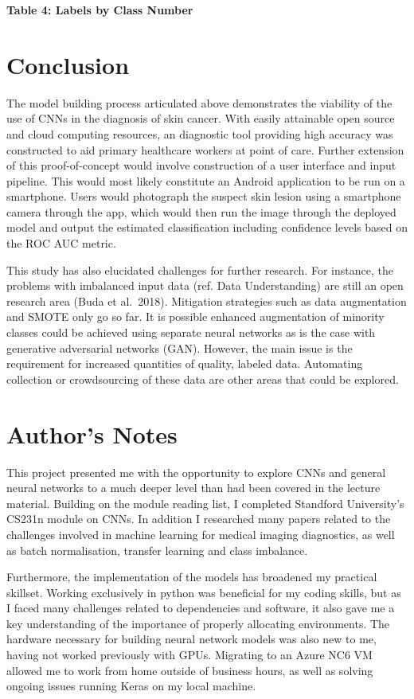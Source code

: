 \documentclass[11pt]{article}
\begin{document}
    \textbf{Table 4: Labels by Class Number}

    \hypertarget{conclusion}{%
\section{Conclusion}\label{conclusion}}

The model building process articulated above demonstrates the viability
of the use of CNNs in the diagnosis of skin cancer. With easily
attainable open source and cloud computing resources, an diagnostic tool
providing high accuracy was constructed to aid primary healthcare
workers at point of care. Further extension of this proof-of-concept
would involve construction of a user interface and input pipeline. This
would most likely constitute an Android application to be run on a
smartphone. Users would photograph the suspect skin lesion using a
smartphone camera through the app, which would then run the image
through the deployed model and output the estimated classification
including confidence levels based on the ROC AUC metric.

This study has also elucidated challenges for further research. For
instance, the problems with imbalanced input data (ref. Data
Understanding) are still an open research area (Buda et al.~2018).
Mitigation strategies such as data augmentation and SMOTE only go so
far. It is possible enhanced augmentation of minority classes could be
achieved using separate neural networks as is the case with generative
adversarial networks (GAN). However, the main issue is the requirement
for increased quantities of quality, labeled data. Automating collection
or crowdsourcing of these data are other areas that could be explored.

    \hypertarget{authors-notes}{%
\section{Author's Notes}\label{authors-notes}}

This project presented me with the opportunity to explore CNNs and
general neural networks to a much deeper level than had been covered in
the lecture material. Building on the module reading list, I completed
Standford University's CS231n module on CNNs. In addition I researched
many papers related to the challenges involved in machine learning for
medical imaging diagnostics, as well as batch normalisation, transfer
learning and class imbalance.

Furthermore, the implementation of the models has broadened my practical
skillset. Working exclusively in python was beneficial for my coding
skills, but as I faced many challenges related to dependencies and
software, it also gave me a key understanding of the importance of
properly allocating environments. The hardware necessary for building
neural network models was also new to me, having not worked previously
with GPUs. Migrating to an Azure NC6 VM allowed me to work from home
outside of business hours, as well as solving ongoing issues running
Keras on my local machine.
\end{document}
